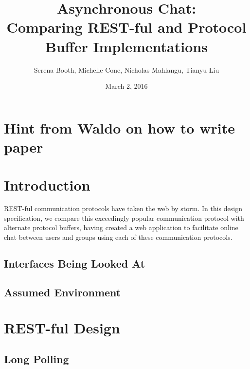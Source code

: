 \documentclass[11pt]{article} %
\title{Asynchronous Chat: \\ Comparing REST-ful and Protocol Buffer Implementations}
\author{Serena Booth, Michelle Cone, Nicholas Mahlangu, Tianyu Liu}
\date{March 2, 2016} %
\begin{document}
\maketitle

\section{Hint from Waldo on how to write paper}

\section{Introduction}

REST-ful communication protocols have taken the web by storm. In this design specification, we compare this exceedingly popular communication protocol with alternate protocol buffers,  having created a web application to facilitate online chat between users and groups using each of these communication protocols. 

\subsection{Interfaces Being Looked At}

\subsection{Assumed Environment}

\section{REST-ful Design}

\subsection{Long Polling} 

\end{document}

